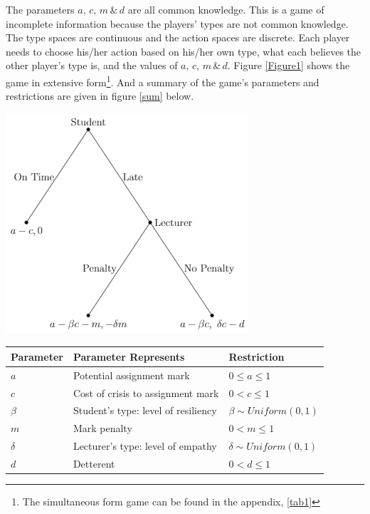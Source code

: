 \documentclass[11pt,preprint, authoryear]{elsarticle}
\let\origfigure\figure
\let\endorigfigure\endfigure
\renewenvironment{figure}[1][2] {
    \expandafter\origfigure\expandafter[H]
} {
    \endorigfigure
}
\let\origtable\table
\let\endorigtable\endtable
\renewenvironment{table}[1][2] {
    \expandafter\origtable\expandafter[H]
} {
    \endorigtable
}
\numberwithin{equation}{section}
\numberwithin{figure}{section}
\numberwithin{table}{section}
\let\rmarkdownfootnote\footnote%
\def\footnote{\protect\rmarkdownfootnote}
\begin{document}
The parameters \(a,\, c,\, m\, \&\, d\) are all common knowledge. This
is a game of incomplete information because the players' types are not
common knowledge. The type spaces are continuous and the action spaces
are discrete. Each player needs to choose his/her action based on
his/her own type, what each believes the other player's type is, and the
values of \(a,\, c,\, m\, \&\, d\). Figure \ref{Figure1} shows the game
in extensive form\footnote{The simultaneous form game can be found in
  the appendix, \ref{tab1}}. And a summary of the game's parameters and
restrictions are given in figure \ref{sum} below.

\begin{figure}[H]

{\centering \includegraphics{img/tree} 

}

\caption{This game is a dynamic game where nature first chooses the student's and lecturer's types. Then the student moves, deciding to hand in on time or late after experiencing a crisis. If the student hands in late, the lecturer decides to impose a penalty or not. \label{Figure1}}\label{fig:Figure1}
\end{figure}

\begin{table}[H]
\centering
\begin{tabular}{lll}
  \toprule
Parameter & Parameter Represents & Restriction \\ 
  \midrule
$a$ & Potential assignment mark & $0\leq a \leq 1$ \\ 
  $c$ & Cost of crisis to assignment mark & $0 < c \leq 1$ \\ 
  $\beta$ & Student's type: level of resiliency & $\beta \sim Uniform(0,1)$  \\ 
  $m$ & Mark penalty & $0 < m \leq 1$ \\ 
  $\delta$ & Lecturer's type: level of empathy & $\delta \sim Uniform(0,1)$ \\ 
  $d$ & Detterent & $0<d \leq 1$ \\ 
   \bottomrule
\end{tabular}
\caption{Game Parameters \label{sum}} 
\end{table}
\end{document}
